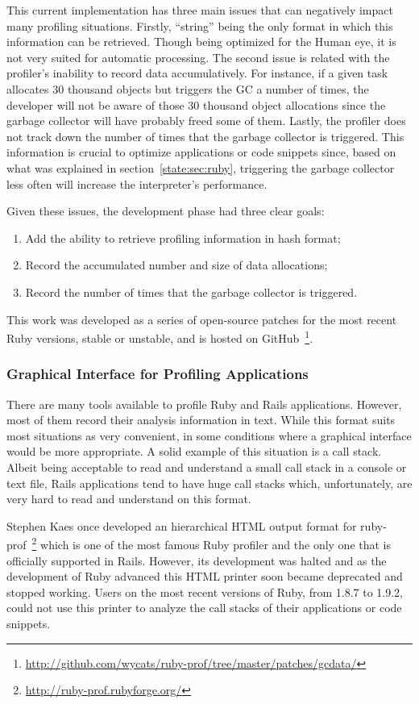 This current implementation has three main issues that can negatively impact many profiling situations. Firstly, ``string'' being the only format in which this information can be retrieved. Though being optimized for the Human eye, it is not very suited for automatic processing. The second issue is related with the profiler's inability to record data accumulatively. For instance, if a given task allocates 30 thousand objects but triggers the GC a number of times, the developer will not be aware of those 30 thousand object allocations since the garbage collector will have probably freed some of them. Lastly, the profiler does not track down the number of times that the garbage collector is triggered. This information is crucial to optimize applications or code snippets since, based on what was explained in section~\ref{state:sec:ruby}, triggering the garbage collector less often will increase the interpreter's performance.

Given these issues, the development phase had three clear goals:
\begin{enumerate}
  \item Add the ability to retrieve profiling information in hash format;
  \item Record the accumulated number and size of data allocations;
  \item Record the number of times that the garbage collector is triggered.
\end{enumerate}

This work was developed as a series of open-source patches for the most recent Ruby versions, stable or unstable, and is hosted on GitHub~\footnote{\url{http://github.com/wycats/ruby-prof/tree/master/patches/gcdata/}}.

\subsubsection{Graphical Interface for Profiling Applications}
There are many tools available to profile Ruby and Rails applications. However, most of them record their analysis information in text. While this format suits most situations as very convenient, in some conditions where a graphical interface would be more appropriate. A solid example of this situation is a call stack. Albeit being acceptable to read and understand a small call stack in a console or text file, Rails applications tend to have huge call stacks which, unfortunately, are very hard to read and understand on this format.

Stephen Kaes once developed an hierarchical HTML output format for ruby-prof~\footnote{\url{http://ruby-prof.rubyforge.org/}} which is one of the most famous Ruby profiler and the only one that is officially supported in Rails. However, its development was halted and as the development of Ruby advanced this HTML printer soon became deprecated and stopped working. Users on the most recent versions of Ruby, from 1.8.7 to 1.9.2, could not use this printer to analyze the call stacks of their applications or code snippets.

